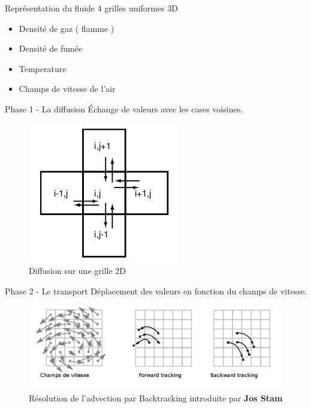 \documentclass{beamer}
\begin{document}
\begin{frame}{Représentation du fluide}
  4 grilles uniformes 3D
  \begin{itemize}
    \item Densité de gaz ( flamme )
    \item Densité de fumée
    \item Temperature
    \item Champs de vitesse de l'air 
  \end{itemize}
\end{frame}



\begin{frame}{Phase 1 - La diffusion}
  Échange de valeurs avec les cases voisines.
  \begin{figure}[h]
    \centering\includegraphics[scale=0.6]{STAM.png}
    \caption{Diffusion sur une grille 2D}
    \label{DiffusionStam}
  \end{figure}
\end{frame}


\begin{frame}{Phase 2 - Le transport}
  Déplacement des valeurs en fonction du champs de vitesse.
  \begin{figure}[h]
    \centering\includegraphics[scale=0.3]{STAM2.png}
    \caption{Résolution de l'advection par Backtracking introduite par \textbf{Jos Stam}}
    \label{AdvectionStam}
  \end{figure}
\end{frame}
\end{document}

